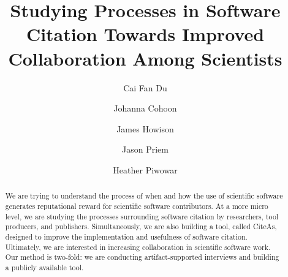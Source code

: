 \documentclass[sigchi-a,screen]{acmart}
\begin{document}
\title[Processes in Software Citation]{Studying Processes in Software Citation Towards Improved Collaboration Among Scientists}

\author{Cai Fan Du}
\author{Johanna Cohoon}
\author{James Howison}

\author{Jason Priem}
\author{Heather Piwowar}



\renewcommand{\shortauthors}{Du, Cohoon, and Howison}

\begin{abstract}
   We are trying to understand the process of when and how the use of scientific software generates reputational reward for scientific software contributors. At a more micro level, we are studying the processes surrounding software citation by researchers, tool producers, and publishers.  Simultaneously, we are also building a tool, called CiteAs, designed to improve the implementation and usefulness of software citation. Ultimately, we are interested in increasing collaboration in scientific software work. Our method is two-fold: we are conducting artifact-supported interviews and building a publicly available tool.
\end{abstract}
\end{document}
